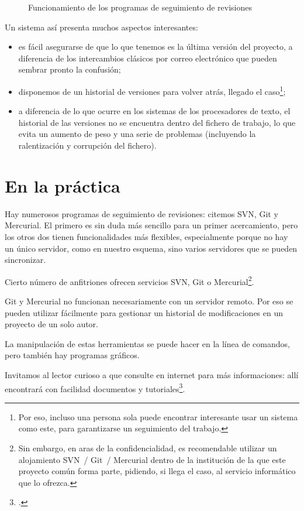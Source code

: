 \begin{figure}[ht]
\centering

\caption{Funcionamiento de los programas de seguimiento de revisiones}\label{svn}
\end{figure}

Un sistema así presenta muchos aspectos interesantes:
\begin{itemize}
\item es fácil asegurarse de que lo que tenemos es la última versión del proyecto, a diferencia de los intercambios clásicos por correo electrónico que pueden sembrar pronto la confusión;
\item disponemos de un historial de versiones para volver atrás, llegado el caso\footnote{Por eso, incluso una persona sola puede encontrar interesante usar un sistema como este, para garantizarse un seguimiento del trabajo.};
\item a diferencia de lo que ocurre en los sistemas de los procesadores de texto, el historial de las versiones no se encuentra dentro del fichero de trabajo, lo que evita un aumento de peso y una serie de problemas (incluyendo la ralentización y corrupción del fichero).
\end{itemize}


\section{En la práctica}
Hay numerosos programas de seguimiento de revisiones: citemos SVN, Git y Mercurial. El primero es sin duda más sencillo para un primer acercamiento, pero los otros dos tienen funcionalidades más flexibles, especialmente porque no hay un único servidor, como en nuestro esquema, sino varios servidores que se pueden sincronizar.

Cierto número de anfitriones ofrecen servicios SVN, Git o Mercurial\footnote{Sin embargo, en aras de la confidencialidad, es recomendable utilizar un alojamiento SVN~/ Git~/ Mercurial dentro de la institución de la que este proyecto común forma parte, pidiendo, si llega el caso, al servicio informático que lo ofrezca.}. 

Git y Mercurial no funcionan necesariamente con un servidor remoto. Por eso se pueden utilizar fácilmente para gestionar un historial de modificaciones en un proyecto de un solo autor.

La manipulación de estas herramientas se puede hacer en la línea de comandos, pero también hay programas gráficos.

Invitamos al lector curioso a que consulte en internet para más informaciones: allí encontrará con facilidad documentos y tutoriales\footcites[Recomendamos, para Git, este magnífico libro:][]{progit}[por nuestra parte, hemos escrito un pequeño tutorial sobre el Uso de Git con una sola persona:][]{git}.

